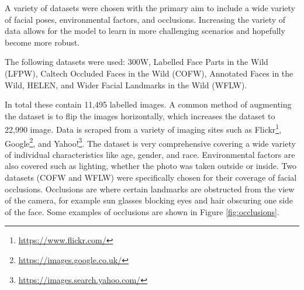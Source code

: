 A variety of datasets were chosen with the primary aim to include a wide variety of facial poses, environmental factors, and occlusions. Increasing the variety of data allows for the model to learn in more challenging scenarios and hopefully become more robust.

The following datasets were used: 300W\cite{sagonas2016300}\cite{sagonas2013300}\cite{sagonas2013semi}, Labelled Face Parts in the Wild (LFPW)\cite{belhumeur2013localizing}\cite{mondal2021lfpw}, Caltech Occluded Faces in the Wild (COFW)\cite{burgos2022caltech}, Annotated Faces in the Wild\cite{zhu2012face}, HELEN\cite{le2012interactive}, and Wider Facial Landmarks in the Wild (WFLW)\cite{wayne2018lab}.

In total these contain 11,495 labelled images. A common method of augmenting the dataset is to flip the images horizontally, which increases the dataset to 22,990 image. Data is scraped from a variety of imaging sites such as Flickr\footnote{\url{https://www.flickr.com/}}, Google\footnote{\url{https://images.google.co.uk/}}, and Yahoo!\footnote{\url{https://images.search.yahoo.com/}}. The dataset is very comprehensive covering a wide variety of individual characteristics like age, gender, and race. Environmental factors are also covered such as lighting, whether the photo was taken outside or inside. 
Two datasets (COFW and WFLW) were specifically chosen for their coverage of facial occlusions. Occlusions are where certain landmarks are obstructed from the view of the camera, for example sun glasses blocking eyes and hair obscuring one side of the face. Some examples of occlusions are shown in Figure \ref{fig:occlusions}.

